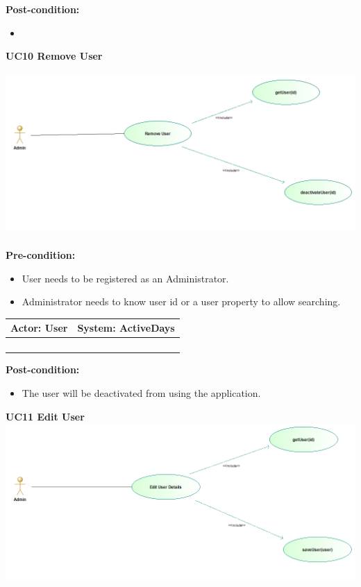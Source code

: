 \documentclass[11pt]{article}
\begin{document}
\textbf{Post-condition: } \\
\begin{itemize}
	\item 
\end{itemize}
\textbf{UC10 Remove User}\\\\
\includegraphics[scale=0.5]{./DiagramsTshepo/removeUser.png}\\\\
\textbf{Pre-condition: }   \\
\begin{itemize}
	\item User needs to be registered as an Administrator.
	\item Administrator needs to know user id or a user property to allow searching. 
\end{itemize}
\begin{center}
	\begin{tabular}{ |p{8cm}|p{8cm}| }
		\hline
		\textbf{Actor:} User & \textbf{System:} ActiveDays \\
		\hline
		&  \\
		\hline
		&  \\
		\hline
		& \\   
		\hline
		& \\
		\hline
	\end{tabular}
\end{center}		
\textbf{Post-condition: } \\
\begin{itemize}
	\item The user will be deactivated from using the application.
\end{itemize}
\textbf{UC11  Edit User}\\
\includegraphics[scale=0.5]{./DiagramsTshepo/editUser.png}\\\\
\end{document}
